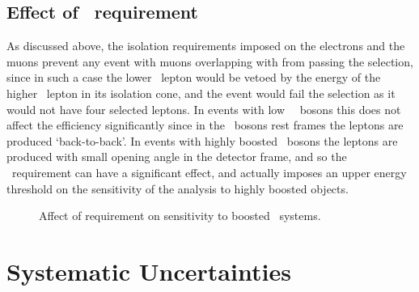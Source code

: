 \subsection{Effect of \deltaR\ requirement}

As discussed above, the isolation requirements imposed on the electrons and the
muons prevent any event with muons overlapping with  from passing
the selection, since in such a case the lower \pt\ lepton would be vetoed by the
energy of the higher \pt\ lepton in its isolation cone, and the event would fail
the selection as it would not have four selected leptons. In events with low
\pt\ \Z\ bosons this does not affect the efficiency significantly since in the
\Z\ bosons rest frames the leptons are produced `back-to-back'. In events with
highly boosted \Z\ bosons the leptons are produced with small opening angle in
the detector frame, and so the \deltaR\ requirement can have a significant
effect, and actually imposes an upper energy threshold on the sensitivity of the
analysis to highly boosted objects.

\begin{figure}[h]
\centering
\caption[Affect of  requirement on sensitivity to boosted
\fourlep\ systems.]{Affect of  requirement on sensitivity to boosted
\fourlep\ systems.}
\label{fig:objsel-deltaRcutoff}
\end{figure}

\section{Systematic Uncertainties}

